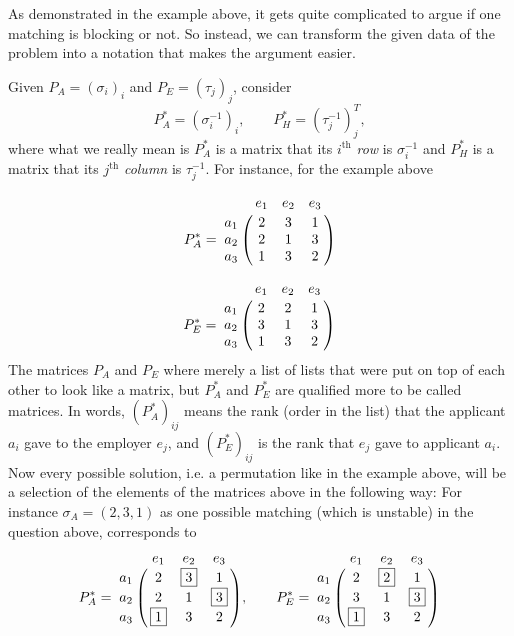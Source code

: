 \documentclass[11pt,a4paper]{article}
\theoremstyle{definition}
\theoremstyle{remark}
\begin{document}
	As demonstrated in the example above, it gets quite complicated to argue if one matching is blocking or not. So instead, we can transform the given data of the problem into a notation that makes the argument easier. 
	
	Given $ P_A = (\sigma_i)_i $ and $ P_E = (\tau_j)_j $, consider \[ P_A^* = (\sigma_i^{-1})_i, \qquad P_H^* = (\tau_j^{-1})_j^T, \]
	where what we really mean is $ P_A^* $ is a matrix that its $ i^\text{th} $ \textit{row} is $ \sigma_i^{-1} $ and $ P_H^* $ is a matrix that its $ j^\text{th} $ \textit{column} is $ \tau_j^{-1} $. For instance, for the example above
	
	\[
	P_A^* =
	\bordermatrix{
		& e_1 & e_2 & e_3 \cr
		a_1 & 2   & 3   & 1   \cr
		a_2 & 2   & 1   & 3   \cr
		a_3 & 1   & 3   & 2   \cr
	}
	\]
	
	\[
	P_E^* =
	\bordermatrix{
		& e_1 & e_2 & e_3 \cr
		a_1 & 2   & 2   & 1   \cr
		a_2 & 3   & 1   & 3   \cr
		a_3 & 1   & 3   & 2   \cr
	}
	\]	
	 The matrices $ P_A $ and $ P_E $ where merely a list of lists that were put on top of each other to look like a matrix, but $ P_A^* $ and $ P_E^* $ are qualified more to be called matrices. In words, $ (P_A^*)_{ij} $ means the rank (order in the list) that the applicant $ a_i $ gave to the employer $ e_j $, and $ (P_E^*)_{ij} $ is the rank that $ e_j $ gave to applicant $ a_i $. Now every possible solution, i.e. a permutation like in the example above, will be a selection of the elements of the matrices above in the following way: For instance $ \sigma_A = (2,3,1) $ as one possible matching (which is unstable) in the question above, corresponds to 
 	\[
 	P_A^* =
 	\bordermatrix{
 		& e_1 & e_2 & e_3 \cr
 		a_1 & 2   & \boxed{3}   & 1   \cr
 		a_2 & 2   & 1   & \boxed{3}   \cr
 		a_3 & \boxed{1}   & 3   & 2   \cr
 	}, \qquad 
 	P_E^* =
 	\bordermatrix{
 		& e_1 & e_2 & e_3 \cr
 		a_1 & 2   & \boxed{2}   & 1   \cr
 		a_2 & 3   & 1   & \boxed{3}   \cr
 		a_3 & \boxed{1}   & 3   & 2   \cr
 	}
 	\]
 	

	
	
	
	
\end{document}
